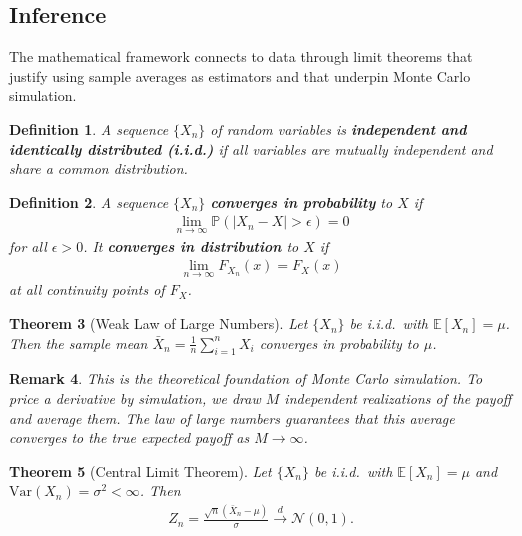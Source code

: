 \documentclass{report}
\theoremstyle{spacedplain}
\newtheorem{theorem}{Theorem}[section]
\theoremstyle{spaceddefinition}
\newtheorem{definition}[theorem]{Definition}
\theoremstyle{spacedremark}
\newtheorem{remark}[theorem]{Remark}
\begin{document}
\subsection{Inference}

The mathematical framework connects to data through limit theorems that justify using sample averages as estimators and that underpin Monte Carlo simulation.

\begin{definition}
A sequence $\{X_n\}$ of random variables is \textbf{independent and identically distributed (i.i.d.)} if all variables are mutually independent and share a common distribution.
\end{definition}

\begin{definition}
A sequence $\{X_n\}$ \textbf{converges in probability} to $X$ if 
\begin{align}
    \lim_{n \to \infty} \mathbb{P}(|X_n - X| > \epsilon) = 0
\end{align} for all $\epsilon > 0$. It \textbf{converges in distribution} to $X$ if 
\begin{align}
    \lim_{n \to \infty} F_{X_n}(x) = F_X(x)
\end{align} at all continuity points of $F_X$.
\end{definition}

\begin{theorem}[Weak Law of Large Numbers]
Let $\{X_n\}$ be i.i.d.\ with $\mathbb{E}[X_n] = \mu$. Then the sample mean $\bar{X}_n = \frac{1}{n}\sum_{i=1}^n X_i$ converges in probability to $\mu$.
\end{theorem}

\begin{remark}
This is the theoretical foundation of Monte Carlo simulation. To price a derivative by simulation, we draw $M$ independent realizations of the payoff and average them. The law of large numbers guarantees that this average converges to the true expected payoff as $M \to \infty$.
\end{remark}

\begin{theorem}[Central Limit Theorem]
Let $\{X_n\}$ be i.i.d.\ with $\mathbb{E}[X_n] = \mu$ and $\text{Var}(X_n) = \sigma^2 < \infty$. Then
\begin{align}
    Z_n = \frac{\sqrt{n}(\bar{X}_n - \mu)}{\sigma} \xrightarrow{d} \mathcal{N}(0,1).
\end{align}
\end{theorem}
\end{document}
